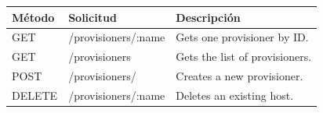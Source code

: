 \documentclass[conference, spanish]{IEEEtran}
\begin{document}
\begin{center}
 \small
 \begin{tabular}{| l | l | l |}
 \hline
  \textbf{Método} & \textbf{Solicitud} & \textbf{Descripción} \\ [0.5ex] 
  \hline\hline
  GET & /provisioners/:name & Gets one provisioner by ID. \\
  \hline
  GET & /provisioners & Gets the list of provisioners. \\
  \hline  
  POST & /provisioners/ & Creates a new provisioner. \\
  \hline
  DELETE & /provisioners/:name & Deletes an existing host. \\ [1ex] 
  \hline
\end{tabular}
\end{center}



%
%

\end{document}
